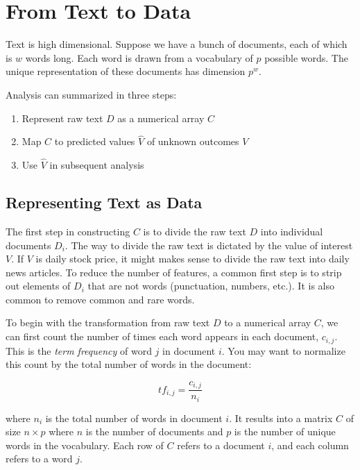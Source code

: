 \chapter{From Text to Data}


Text is high dimensional. 
Suppose we have a bunch of documents, each of 
which is $w$ words long. Each word is 
drawn from a vocabulary of $p$ possible 
words. The unique representation of these 
documents has dimension $p^w$. 

Analysis can 
summarized in three steps:

\begin{enumerate}
    \item Represent raw text $D$ as a numerical 
    array $C$
    \item Map $C$ to predicted 
    values $\hat{V}$ of unknown outcomes 
    $V$
    \item Use $\hat{V}$ in subsequent analysis
\end{enumerate}


\section{Representing Text as Data}
 

The first step in constructing $C$ is 
to divide the raw text $D$ into individual documents 
$D_i$. The way to divide the raw text 
is dictated by the value of interest $V$. 
If $V$ is daily stock price, it might makes sense
to divide the raw text into daily news articles.
To reduce the number of features, 
a common first step is to strip out elements 
of $D_i$ that are not words (punctuation,
numbers, etc.). It is also common to remove common and rare words.

To begin with the transformation from raw text $D$ to
a numerical array $C$, we can first count 
the number of times each word appears in each document, $c_{i,j}$.
This is the \textit{term frequency} of word $j$ in document $i$. You 
may want to normalize this count by the total number of words in the document:

\begin{equation}
tf_{i,j} = \frac{c_{i,j}}{n_i}
\end{equation}

where $n_i$ is the total number of words in document $i$.
It results into a matrix $C$ of size $n \times p$ where $n$ is the number of documents and $p$ is 
the number of unique words in the vocabulary.
Each row of $C$ refers to a document $i$, and each column refers to a word $j$.


